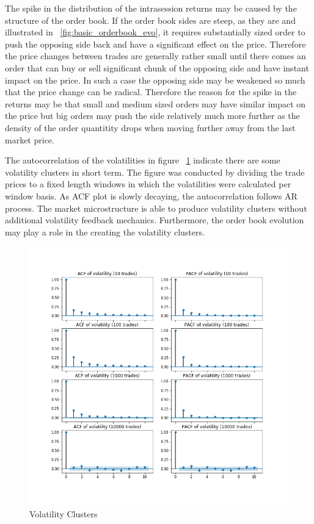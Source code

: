 The spike in the distribution of the intrasession returns may be caused by the structure of the order book. If the order book 
sides are steep, as they are and illustrated in ~\ref{fig:basic_orderbook_evo}, it requires substantially sized 
order to push the opposing side back and have a significant effect on the price. Therefore the price changes between trades 
are generally rather small until there comes an order that can buy or sell significant chunk of the opposing side and have 
instant impact on the price. In such a case the opposing side may be weakened so much that the price change can be radical. 
Therefore the reason for the spike in the returns may be that small and medium sized orders may have similar impact on the 
price but big orders may push the side relatively much more further as the density of the order quantitity drops when moving 
further away from the last market price.

The autocorrelation of the volatilities in figure ~\ref{fig:basic_volaclusters}
indicate there are some volatility clusters in short term. The figure was conducted by
dividing the trade prices to a fixed length windows in which the volatilities were calculated per
window basis. As ACF plot is slowly decaying, the autocorrelation follows AR process. The market 
microstructure is able to produce volatility clusters without additional volatility feedback mechanics.
Furthermore, the order book evolution may play a role in the creating the volatility clusters.

\begin{figure}
    \includegraphics[width=\linewidth]{plots/basic_volaclusters_intra.png}
    \caption{Volatility Clusters}
    \label{fig:basic_volaclusters}
\end{figure}

